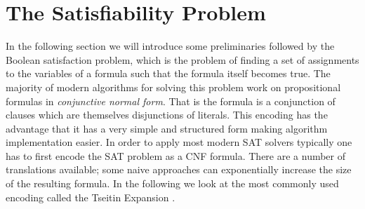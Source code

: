 \section{The Satisfiability Problem}
In the following section we will introduce some preliminaries followed by the Boolean satisfaction problem, which is the problem of finding a set of assignments to the variables of a formula such that the formula itself becomes true. The majority of modern algorithms for solving this problem work on propositional formulas in \emph{conjunctive normal form}. That is the formula is a conjunction of clauses which are themselves disjunctions of literals. This encoding has the advantage that it has a very simple and structured form making algorithm implementation easier. In order to apply most modern SAT solvers typically one has to first encode the SAT problem as a CNF formula. There are a number of translations available; some naive approaches can exponentially increase the size of the resulting formula. In the following we look at the most commonly used encoding called the Tseitin Expansion \cite{GT83}.
\medskip
